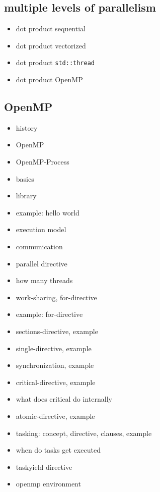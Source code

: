 \documentclass[8pt,a4paper,fleqn]{article}
\begin{document}
\begin{multicols}{2}
  \section{multiple levels of parallelism} %
  \label{sec:multiple_levels_of_parallelism}
  \begin{itemize}
    \item dot product sequential
    \item dot product vectorized
    \item dot product \texttt{std::thread}
    \item dot product OpenMP
  \end{itemize}
  \subsection{OpenMP} %
  \label{sub:openmp}
  \begin{itemize}
    \item history
    \item OpenMP
    \item OpenMP-Process
    \item basics
    \item library
    \item example: hello world
    \item execution model
    \item communication
    \item parallel directive
    \item how many threads
    \item work-sharing, for-directive
    \item example: for-directive
    \item sections-directive, example
    \item single-directive, example
    \item synchronization, example
    \item critical-directive, example
    \item what does critical do internally
    \item atomic-directive, example
    \item tasking: concept, directive, clauses, example
    \item when do tasks get executed
    \item taskyield directive
    \item openmp environment
  \end{itemize}
  \end{multicols}
\end{document}
